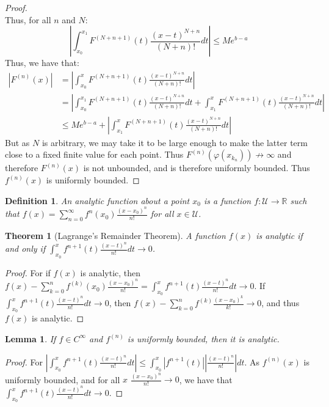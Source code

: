 \documentclass[oneside]{book}
\theoremstyle{mystyle}
\newtheorem{theorem}{Theorem}[section]
\newtheorem{definition}{Definition}[section]
\newtheorem{lemma}{Lemma}[section]
\begin{document}
\begin{proof}
\begin{equation*}
\end{equation*}
%
Thus, for all $n$ and $N$:
%
\begin{equation*}
    |\int_{x_0}^{x_1} F^{(N+n+1)}(t)\frac{(x-t)^{N+n}}{(N+n)!}dt|\leq Me^{b-a}
\end{equation*}
%
Thus, we have that:
%
\begin{align*}
    |F^{(n)}(x)| &= |\int_{x_0}^{x} F^{(N+n+1)}(t)\frac{(x-t)^{N+n}}{(N+n)!}dt|\\ &= |\int_{x_0}^{x_1} F^{(N+n+1)}(t)\frac{(x-t)^{N+n}}{(N+n)!}dt+\int_{x_1}^{x} F^{(N+n+1)}(t)\frac{(x-t)^{N+n}}{(N+n)!}dt|\\
    &\leq Me^{b-a}+|\int_{x_1}^{x} F^{(N+n+1)}(t)\frac{(x-t)^{N+n}}{(N+n)!}dt|
\end{align*}
%
But as $N$ is arbitrary, we may take it to be large enough to make the latter term close to a fixed finite value for each point. Thus $F^{(n)}(\varphi(x_{k_n}))\not\rightarrow \infty$ and therefore $F^{(n)}(x)$ is not unbounded, and is therefore uniformly bounded. Thus $f^{(n)}(x)$ is uniformly bounded.
\end{proof}

\begin{definition}
An analytic function about a point $x_0$ is a function $f:\mathcal{U}\rightarrow\mathbb{R}$ such that $f(x) = \sum_{n=0}^{\infty} f^{n}(x_0) \frac{(x-x_0)^{n}}{n!}$ for all $x\in\mathcal{U}$.
\end{definition}

\begin{theorem}[Lagrange's Remainder Theorem]
A function $f(x)$ is analytic if and only if $\int_{x_0}^{x}f^{n+1}(t)\frac{(x-t)^n}{n!}dt\rightarrow 0$.
\end{theorem}
\begin{proof}
For if $f(x)$ is analytic, then $f(x)-\sum_{k=0}^{n} f^{(k)}(x_0)\frac{(x-x_0)^n}{n!} = \int_{x_0}^{x}f^{n+1}(t)\frac{(x-t)^n}{n!}dt \rightarrow 0$. If $\int_{x_0}^{x}f^{n+1}(t)\frac{(x-t)^n}{n!}dt\rightarrow 0$, then $f(x)-\sum_{k=0}^{n}f^{(k)}\frac{(x-x_0)^{k}}{k!}\rightarrow 0$, and thus $f(x)$ is analytic.
\end{proof}

\begin{lemma}
If $f\in C^{\infty}$ and $f^{(n)}$ is uniformly bounded, then it is analytic.
\end{lemma}
\begin{proof}
For $|\int_{x_0}^{x}f^{n+1}(t)\frac{(x-t)^n}{n!}dt|\leq \int_{x_0}^{x}|f^{n+1}(t)||\frac{(x-t)^n}{n!}|dt$. As $f^{(n)}(x)$ is uniformly bounded, and for all $x$ $\frac{(x-x_0)^n}{n!} \rightarrow 0$, we have that $\int_{x_0}^{x}f^{n+1}(t)\frac{(x-t)^n}{n!}dt\rightarrow 0$.
\end{proof}
\end{document}
